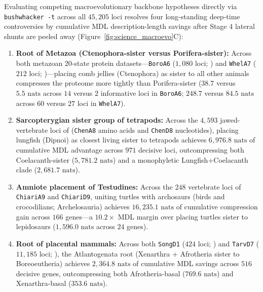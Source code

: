 \documentclass[11pt,a4paper]{article}
\begin{document}
Evaluating competing macroevolutionary backbone hypotheses directly via \texttt{bushwhacker -t} across all $45,205$ loci resolves four long-standing deep-time controversies by cumulative MDL description-length savings after Stage 4 lateral shunts are peeled away (Figure~\ref{fig:science_macroevo}C):
\begin{enumerate}
\item \textbf{Root of Metazoa (Ctenophora-sister versus Porifera-sister):} Across both metazoan 20-state protein datasets---\texttt{BoroA6} ($1,080$ loci; \citealt{borowiec2015extracting}) and \texttt{WhelA7} ($212$ loci; \citealt{whelan2017ctenophore})---placing comb jellies (Ctenophora) as sister to all other animals compresses the proteome more tightly than Porifera-sister ($38.7$ versus $5.5\text{ nats}$ across $14$ versus $2$ informative loci in \texttt{BoroA6}; $248.7$ versus $84.5\text{ nats}$ across $60$ versus $27$ loci in \texttt{WhelA7}).
\item \textbf{Sarcopterygian sister group of tetrapods:} Across the $4,593$ jawed-vertebrate loci of \citet{chen2015identifying} (\texttt{ChenA8} amino acids and \texttt{ChenD8} nucleotides), placing lungfish (Dipnoi) as closest living sister to tetrapods achieves $6,976.8\text{ nats}$ of cumulative MDL advantage across $971$ decisive loci, outcompressing both Coelacanth-sister ($5,781.2\text{ nats}$) and a monophyletic Lungfish+Coelacanth clade ($2,681.7\text{ nats}$).
\item \textbf{Amniote placement of Testudines:} Across the $248$ vertebrate loci of \texttt{ChiariA9} and \texttt{ChiariD9}, uniting turtles with archosaurs (birds and crocodilians; Archelosauria) achieves $16,235.1\text{ nats}$ of cumulative compression gain across $166$ genes---a $10.2\times$ MDL margin over placing turtles sister to lepidosaurs ($1,596.0\text{ nats}$ across $24$ genes).
\item \textbf{Root of placental mammals:} Across both \texttt{SongD1} ($424$ loci; \citealt{song2012resolving}) and \texttt{TarvD7} ($11,185$ loci; \citealt{tarver2016calibration}), the Atlantogenata root (Xenarthra + Afrotheria sister to Boreoeutheria) achieves $2,364.8\text{ nats}$ of cumulative MDL savings across $516$ decisive genes, outcompressing both Afrotheria-basal ($769.6\text{ nats}$) and Xenarthra-basal ($353.6\text{ nats}$).
\end{enumerate}
\end{document}
